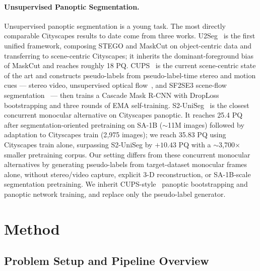 \documentclass{article}
\begin{document}
\paragraph{Unsupervised Panoptic Segmentation.}
Unsupervised panoptic segmentation is a young task. The most directly comparable Cityscapes results to date come from three works. U2Seg~\cite{niu2024u2seg} is the first unified framework, composing STEGO and MaskCut on object-centric data and transferring to scene-centric Cityscapes; it inherits the dominant-foreground bias of MaskCut and reaches roughly 18 PQ. CUPS~\cite{hahn2025cups} is the current scene-centric state of the art and constructs pseudo-labels from pseudo-label-time stereo and motion cues --- stereo video, unsupervised optical flow~\cite{stone2021smurf}, and SF2SE3 scene-flow segmentation~\cite{sommer2022sf2se3} --- then trains a Cascade Mask R-CNN with DropLoss bootstrapping and three rounds of EMA self-training. S2-UniSeg~\cite{xu2025s2uniseg} is the closest concurrent monocular alternative on Cityscapes panoptic. It reaches 25.4 PQ after segmentation-oriented pretraining on SA-1B ($\sim$11M images) followed by adaptation to Cityscapes train (2{,}975 images); we reach 35.83 PQ using Cityscapes train alone, surpassing S2-UniSeg by $+10.43$ PQ with a $\sim$3{,}700$\times$ smaller pretraining corpus. Our setting differs from these concurrent monocular alternatives by generating pseudo-labels from target-dataset monocular frames alone, without stereo/video capture, explicit 3-D reconstruction, or SA-1B-scale segmentation pretraining. We inherit CUPS-style~\cite{hahn2025cups} panoptic bootstrapping and panoptic network training, and replace only the pseudo-label generator.


\section{Method}
\label{sec:method}

\subsection{Problem Setup and Pipeline Overview}
\label{sec:method:setup}
\end{document}
